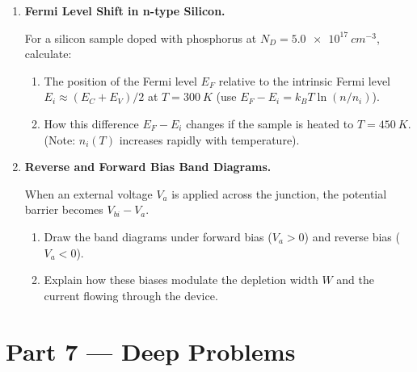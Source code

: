 \documentclass[12pt, a4paper]{book}
\begin{document}
\begin{problembox}
\begin{enumerate}[label=\textbf{P\arabic*.}]
  \item \textbf{Fermi Level Shift in n-type Silicon.}
  
        For a silicon sample doped with phosphorus at $N_D = \SI{5.0e17}{cm^{-3}}$, calculate:
        \begin{enumerate}[label=(\alph*)]
          \item The position of the Fermi level $E_F$ relative to the intrinsic Fermi level $E_i \approx (E_C+E_V)/2$ at $T = \SI{300}{K}$ (use $E_F - E_i = k_B T \ln(n/n_i)$).
          \item How this difference $E_F - E_i$ changes if the sample is heated to $T = \SI{450}{K}$. (Note: $n_i(T)$ increases rapidly with temperature).
        \end{enumerate}

  \item \textbf{Reverse and Forward Bias Band Diagrams.}
  
        When an external voltage $V_a$ is applied across the junction, the potential barrier becomes $V_{bi} - V_a$.
        \begin{enumerate}[label=(\alph*)]
          \item Draw the band diagrams under forward bias ($V_a > 0$) and reverse bias ($V_a < 0$).
          \item Explain how these biases modulate the depletion width $W$ and the current flowing through the device.
        \end{enumerate}
\end{enumerate}
\end{problembox}

\newpage

\section{Part 7 --- Deep Problems}
\end{document}
